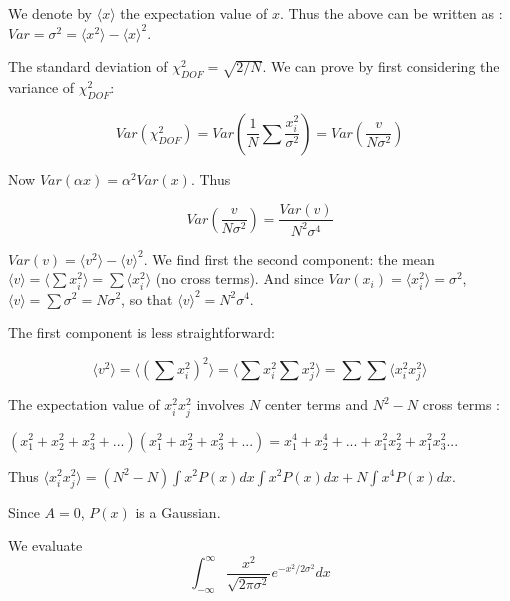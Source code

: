 \documentclass[fleqn,usenatbib]{mnras}  %
\begin{document}
We denote by $\langle x \rangle$ the expectation value of $x$. Thus the above can be written as : $Var= \sigma^{2} = \langle x^{2} \rangle - \langle x \rangle ^{2}$. 


The standard deviation of  $\chi^{2}_{DOF} = \sqrt{2/N}$. We can prove by first considering the  variance of $\chi^{2}_{DOF}$: 

\begin{equation}
Var(\chi^{2}_{DOF}) = Var\left(\frac{1}{N} \sum \frac{x_{i}^{2}}{\sigma^{2}} \right) = Var\left(\frac{v}{N \sigma^{2}}\right)
\end{equation}

Now $Var(\alpha x) = \alpha^{2} Var(x)$. Thus 

\begin{equation} 
Var\left(\frac{v}{N \sigma^{2}}\right) = \frac{Var(v)}{N^{2} \sigma^{4}} 
\end{equation}

$Var(v) = \langle v^{2} \rangle - \langle v \rangle ^{2}$. We find first the second component:  the mean $\langle v \rangle = \langle \sum x_{i}^{2} \rangle = \sum \langle x_{i}^{2} \rangle $ (no cross terms). And since $Var(x_{i}) = \langle x_{i}^{2} \rangle= \sigma^{2}$, $\langle v \rangle = \sum \sigma^{2} = N \sigma^{2}$, so that $\langle v \rangle ^{2} = N^{2} \sigma^{4}$. 

The first component is less straightforward: 

\begin{equation}
\langle v^{2} \rangle  = \langle (\sum x_{i}^{2} ) ^{2} \rangle  =  \langle \sum x_{i}^{2}  \sum x_{j}^{2}   \rangle = \sum \sum \langle x_{i}^{2} x_{j}^{2} \rangle
\end{equation}

The expectation value of $x_{i}^{2} x_{j}^{2}$ involves $N$ center terms and $N^{2}-N$ cross terms : 

$(x_{1}^{2} + x_{2}^{2} +x_{3}^{2} +...)(x_{1}^{2} + x_{2}^{2} +x_{3}^{2} +...)= x_{1}^{4} + x_{2}^{4}+...+x_{1}^{2}x_{2}^{2} + x_{1}^{2}x_{3}^{2}...$

Thus $\langle x_{i}^{2} x_{j}^{2} \rangle = (N^{2}-N) \int x^{2} P(x) dx \int x^{2} P(x) dx  + N \int x^{4} P(x) dx  $. 

Since $A=0$, $P(x)$ is a Gaussian. 

We evaluate 
\begin{equation}
\int_{-\infty}^{\infty} \frac{x^{2}}{\sqrt{2\pi \sigma^{2}}} e^{-x^{2} / 2 \sigma^{2}} dx 
\end{equation}
\end{document}
